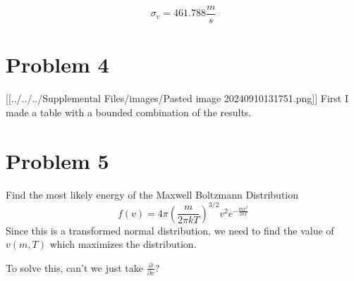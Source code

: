 \documentclass[]{article}
\begin{document}
\begin{Shaded}
\begin{Highlighting}[]
\end{Highlighting}
\end{Shaded}

\[\sigma_{v} = 461.788 \frac{m}{s}\]

\hypertarget{problem-4}{%
\section{Problem 4}\label{problem-4}}

{[}{[}../../../Supplemental Files/images/Pasted image
20240910131751.png{]}{]} First I made a table with a bounded combination
of the results.

\hypertarget{problem-5}{%
\section{Problem 5}\label{problem-5}}

Find the most likely energy of the Maxwell Boltzmann Distribution \[
f(v) = 4\pi \left(\frac{m}{2\pi kT}\right)^{3/2} v^2 e^{-\frac{mv^2}{2kT}}
\] Since this is a transformed normal distribution, we need to find the
value of \(v(m,T)\) which maximizes the distribution.

To solve this, can't we just take \(\frac{\partial}{\partial v}\)?
\end{document}
